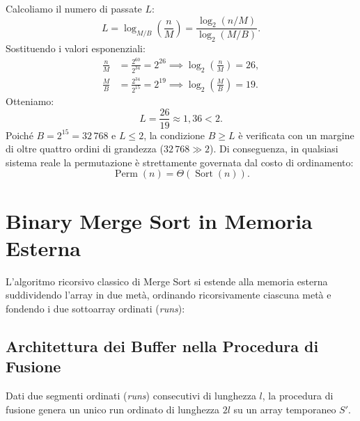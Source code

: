 Calcoliamo il numero di passate $L$:
\[
  L = \log_{M/B}\left(\frac{n}{M}\right) = \frac{\log_2(n / M)}{\log_2(M / B)}.
\]
Sostituendo i valori esponenziali:
\begin{align*}
  \frac{n}{M} &= \frac{2^{60}}{2^{34}} = 2^{26} \implies \log_2\left(\frac{n}{M}\right) = 26, \\
  \frac{M}{B} &= \frac{2^{34}}{2^{15}} = 2^{19} \implies \log_2\left(\frac{M}{B}\right) = 19.
\end{align*}
Otteniamo:
\[
  L = \frac{26}{19} \approx 1{,}36 < 2.
\]
Poiché $B = 2^{15} = 32\,768$ e $L \le 2$, la condizione $B \ge L$ è verificata con un margine di oltre quattro ordini di grandezza ($32\,768 \gg 2$). Di conseguenza, in qualsiasi sistema reale la permutazione è strettamente governata dal costo di ordinamento:
\[
  \operatorname{Perm}(n) = \Theta(\operatorname{Sort}(n)).
\]

\FloatBarrier
\section{Binary Merge Sort in Memoria Esterna}
\label{sec:binary-merge-sort}

L'algoritmo ricorsivo classico di Merge Sort si estende alla memoria esterna suddividendo l'array in due metà, ordinando ricorsivamente ciascuna metà e fondendo i due sottoarray ordinati (\textit{runs}):

\begin{algorithm}[H]
  \DontPrintSemicolon
  \caption{Binary Merge Sort}
\end{algorithm}

\FloatBarrier
\subsection{Architettura dei Buffer nella Procedura di Fusione}
\label{subsec:merge-procedure}

Dati due segmenti ordinati (\textit{runs}) consecutivi di lunghezza $l$, la procedura di fusione genera un unico run ordinato di lunghezza $2l$ su un array temporaneo $S'$.

